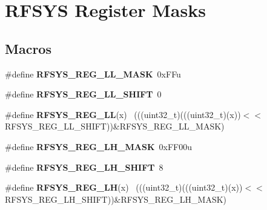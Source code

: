 \hypertarget{group___r_f_s_y_s___register___masks}{}\section{R\+F\+S\+Y\+S Register Masks}
\label{group___r_f_s_y_s___register___masks}
\subsection*{Macros}
\begin{DoxyCompactItemize}
\item 
\hypertarget{group___r_f_s_y_s___register___masks_ga2fe64579aaef18ce266e3d6c316d3241}{}\#define {\bfseries R\+F\+S\+Y\+S\+\_\+\+R\+E\+G\+\_\+\+L\+L\+\_\+\+M\+A\+S\+K}~0x\+F\+Fu\label{group___r_f_s_y_s___register___masks_ga2fe64579aaef18ce266e3d6c316d3241}

\item 
\hypertarget{group___r_f_s_y_s___register___masks_gaab45c60c0a8e5edb59537ee2bcb2bbcf}{}\#define {\bfseries R\+F\+S\+Y\+S\+\_\+\+R\+E\+G\+\_\+\+L\+L\+\_\+\+S\+H\+I\+F\+T}~0\label{group___r_f_s_y_s___register___masks_gaab45c60c0a8e5edb59537ee2bcb2bbcf}

\item 
\hypertarget{group___r_f_s_y_s___register___masks_ga605e2a9b11854ce01ce33ab06ee481ab}{}\#define {\bfseries R\+F\+S\+Y\+S\+\_\+\+R\+E\+G\+\_\+\+L\+L}(x)                                                ~(((uint32\+\_\+t)(((uint32\+\_\+t)(x))$<$$<$R\+F\+S\+Y\+S\+\_\+\+R\+E\+G\+\_\+\+L\+L\+\_\+\+S\+H\+I\+F\+T))\&R\+F\+S\+Y\+S\+\_\+\+R\+E\+G\+\_\+\+L\+L\+\_\+\+M\+A\+S\+K)\label{group___r_f_s_y_s___register___masks_ga605e2a9b11854ce01ce33ab06ee481ab}

\item 
\hypertarget{group___r_f_s_y_s___register___masks_ga9f8ddcb45324c34fd2d19417b8b13d11}{}\#define {\bfseries R\+F\+S\+Y\+S\+\_\+\+R\+E\+G\+\_\+\+L\+H\+\_\+\+M\+A\+S\+K}~0x\+F\+F00u\label{group___r_f_s_y_s___register___masks_ga9f8ddcb45324c34fd2d19417b8b13d11}

\item 
\hypertarget{group___r_f_s_y_s___register___masks_gabe96c857aab7668805c1fb3ea46693bf}{}\#define {\bfseries R\+F\+S\+Y\+S\+\_\+\+R\+E\+G\+\_\+\+L\+H\+\_\+\+S\+H\+I\+F\+T}~8\label{group___r_f_s_y_s___register___masks_gabe96c857aab7668805c1fb3ea46693bf}

\item 
\hypertarget{group___r_f_s_y_s___register___masks_ga9e5f30d82693f4f97b51b6459c3dc590}{}\#define {\bfseries R\+F\+S\+Y\+S\+\_\+\+R\+E\+G\+\_\+\+L\+H}(x)                                                ~(((uint32\+\_\+t)(((uint32\+\_\+t)(x))$<$$<$R\+F\+S\+Y\+S\+\_\+\+R\+E\+G\+\_\+\+L\+H\+\_\+\+S\+H\+I\+F\+T))\&R\+F\+S\+Y\+S\+\_\+\+R\+E\+G\+\_\+\+L\+H\+\_\+\+M\+A\+S\+K)\label{group___r_f_s_y_s___register___masks_ga9e5f30d82693f4f97b51b6459c3dc590}


\end{DoxyCompactItemize}
